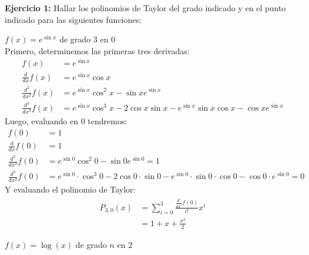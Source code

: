 \documentclass[../../main.tex]{subfiles}
\begin{document}
\question \textbf{Ejercicio 1:} Hallar los polinomios de Taylor del grado indicado y en el punto indicado para las siguientes funciones:
\begin{partes}
    \parte $f(x) = e^{\sin x}$ de grado 3 en 0\\

    Primero, determinemos las primeras tres derivadas:
    \begin{align*}
        f(x) &= e^{\sin x}\\
        \frac{d}{dx} f(x) &= e^{\sin x} \cos x\\
        \frac{d^2}{dx^2} f(x) &= e^{\sin x}\cos^2 x - \sin x e^{\sin x}\\
        \frac{d^3}{dx^3} f(x) &= e^{\sin x}\cos^3 x - 2\cos x \sin x - e^{\sin x}\sin x \cos x - \cos x e^{\sin x}
    \end{align*}
    Luego, evaluando en $0$ tendremos:
    \begin{align*}
        f(0) &= 1\\
        \frac{d}{dx} f(0) &= 1\\
        \frac{d^2}{dx^2} f(0) &= e^{\sin 0}\cos^2 0 - \sin 0 e^{\sin 0} = 1\\
        \frac{d^3}{dx^3} f(0) &= e^{\sin 0}\cdot \cos^3 0 - 2\cos 0 \cdot \sin 0 - e^{\sin 0}\cdot \sin 0 \cdot \cos 0 - \cos 0 \cdot e^{\sin 0} = 0
    \end{align*}
    Y evaluando el polinomio de Taylor:
    \begin{align*}
        P_{3, 0}(x) &= \sum_{i = 0}^3 \frac{\frac{d^i}{dx^i} f(0)}{i!} x^i\\
        &= 1 + x + \frac{x^2}{2}
    \end{align*}

    \parte $f(x) = \log(x)$ de grado $n$ en $2$\\


\end{partes}
\end{document}
